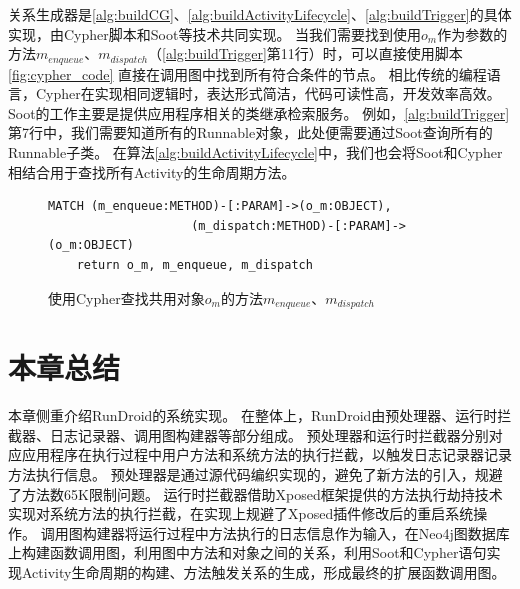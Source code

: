 关系生成器是\autoref{alg:buildCG}、\autoref{alg:buildActivityLifecycle}、\autoref{alg:buildTrigger}的具体实现，由Cypher脚本和Soot等技术共同实现。
当我们需要找到使用$o_{m}$作为参数的方法$m_{enqueue}$、$m_{dispatch}$（\autoref{alg:buildTrigger}第11行）时，可以直接使用脚本\autoref{fig:cypher_code}
直接在调用图中找到所有符合条件的节点。
相比传统的编程语言，Cypher在实现相同逻辑时，表达形式简洁，代码可读性高，开发效率高效。
Soot的工作主要是提供应用程序相关的类继承检索服务。
例如，\autoref{alg:buildTrigger}第7行中，我们需要知道所有的Runnable对象，此处便需要通过Soot查询所有的Runnable子类。
在算法\ref{alg:buildActivityLifecycle}中，我们也会将Soot和Cypher相结合用于查找所有Activity的生命周期方法。


\begin{figure}[!h]
	\centering
	\begin{lstlisting}[style=normal,language=cypher]
	MATCH (m_enqueue:METHOD)-[:PARAM]->(o_m:OBJECT),
					(m_dispatch:METHOD)-[:PARAM]->(o_m:OBJECT)
	return o_m, m_enqueue, m_dispatch\end{lstlisting}
	\caption{使用Cypher查找共用对象$o_m$的方法$m_{enqueue}$、$m_{dispatch}$}
	\label{fig:cypher_code}
\end{figure}


 \section{本章总结}

本章侧重介绍RunDroid的系统实现。
在整体上，RunDroid由预处理器、运行时拦截器、日志记录器、调用图构建器等部分组成。
预处理器和运行时拦截器分别对应应用程序在执行过程中用户方法和系统方法的执行拦截，以触发日志记录器记录方法执行信息。
预处理器是通过源代码编织实现的，避免了新方法的引入，规避了方法数65K限制问题。
运行时拦截器借助Xposed框架提供的方法执行劫持技术实现对系统方法的执行拦截，在实现上规避了Xposed插件修改后的重启系统操作。
调用图构建器将运行过程中方法执行的日志信息作为输入，在Neo4j图数据库上构建函数调用图，利用图中方法和对象之间的关系，利用Soot和Cypher语句实现Activity生命周期的构建、方法触发关系的生成，形成最终的扩展函数调用图。
